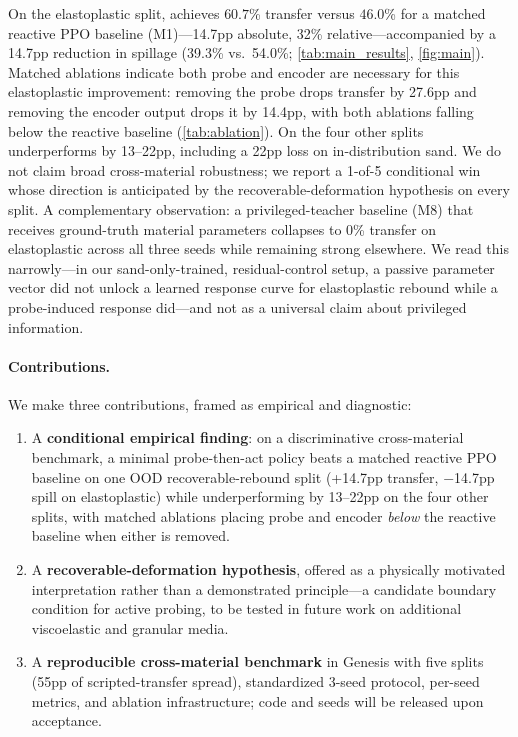 On the elastoplastic split, \PTA{} achieves $60.7$\% transfer versus $46.0$\% for a matched reactive PPO baseline (M1)---14.7pp absolute, 32\% relative---accompanied by a 14.7pp reduction in spillage (39.3\% vs.\ 54.0\%; \cref{tab:main_results}, \cref{fig:main}). Matched ablations indicate both probe and encoder are necessary for this elastoplastic improvement: removing the probe drops transfer by 27.6pp and removing the encoder output drops it by 14.4pp, with both ablations falling below the reactive baseline (\cref{tab:ablation}). On the four other splits \PTA{} underperforms by 13--22pp, including a 22pp loss on in-distribution sand. We do not claim broad cross-material robustness; we report a 1-of-5 conditional win whose direction is anticipated by the recoverable-deformation hypothesis on every split. A complementary observation: a privileged-teacher baseline (M8) that receives ground-truth material parameters collapses to 0\% transfer on elastoplastic across all three seeds while remaining strong elsewhere. We read this narrowly---in our sand-only-trained, residual-control setup, a passive parameter vector did not unlock a learned response curve for elastoplastic rebound while a probe-induced response did---and not as a universal claim about privileged information.

\paragraph{Contributions.} We make three contributions, framed as empirical and diagnostic:
\begin{enumerate}
    \item A \textbf{conditional empirical finding}: on a discriminative cross-material benchmark, a minimal probe-then-act policy beats a matched reactive PPO baseline on one OOD recoverable-rebound split (+14.7pp transfer, $-$14.7pp spill on elastoplastic) while underperforming by 13--22pp on the four other splits, with matched ablations placing probe and encoder \emph{below} the reactive baseline when either is removed.
    \item A \textbf{recoverable-deformation hypothesis}, offered as a physically motivated interpretation rather than a demonstrated principle---a candidate boundary condition for active probing, to be tested in future work on additional viscoelastic and granular media.
    \item A \textbf{reproducible cross-material benchmark} in Genesis with five splits (55pp of scripted-transfer spread), standardized 3-seed protocol, per-seed metrics, and ablation infrastructure; code and seeds will be released upon acceptance.
\end{enumerate}

